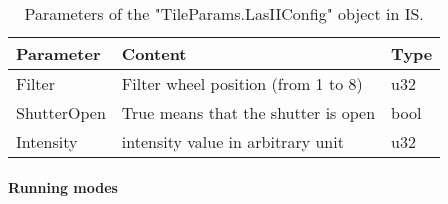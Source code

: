 \begin{table}[ht]
  \begin{center}
    \caption{Parameters of the "TileParams.LasIIConfig" object in IS.}\label{tab:IS:lasIIconfig}
    \begin{tabular}{lll}
      \hline\hline
      Parameter & Content & Type \\
      \hline
      Filter & Filter wheel position (from 1 to 8) & u32 \\
      ShutterOpen & True means that the shutter is open & bool \\
      Intensity & \las{} intensity value in arbitrary unit & u32 \\
      \hline
    \end{tabular}
  \end{center}
\end{table}

\paragraph{Running modes}

